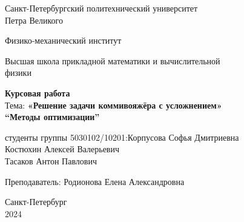  \begin{titlepage}
    \begin{center}
      Санкт-Петербургский политехнический университет \\Петра Великого
    \end{center}

    \begin{center}
      Физико-механический институт
    \end{center}

    \begin{center}
      Высшая школа прикладной математики и вычислительной\\ физики
    \end{center}

    \vspace{8em}

    \begin{center}
      \textbf{Курсовая работа}\\
      Тема: \textbf{«Решение задачи коммивояжёра с усложнением»}\\
      \textbf{“Методы оптимизации”}
    \end{center}

    \vspace{\fill}

    \begin{flushright}
       студенты группы 5030102/10201:\hfill Корпусова Софья Дмитриевна \\
      Костюхин Алексей Валерьевич \\
      Тасаков Антон Павлович \\
    \end{flushright}
    Преподаватель: \hfill Родионова Елена Александровна

    \vspace{12em}

    \begin{center}
      Санкт-Петербург\\
      2024
    \end{center}
  \end{titlepage}